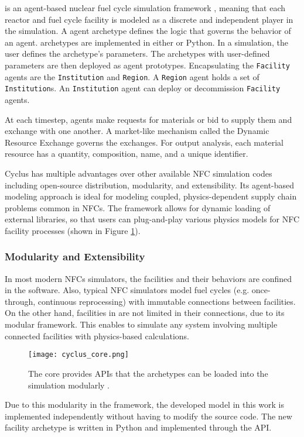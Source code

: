\Cyclus is an agent-based nuclear fuel cycle simulation framework 
\cite{huff_fundamental_2016}, meaning
that each reactor and fuel cycle facility is modeled as a discrete and independent
player in the simulation.
A \Cyclus agent archetype defines the logic that governs the behavior
of an agent. 
\Cyclus archetypes are implemented in  either \CC  or Python.
In a simulation, the user defines the archetype's
parameters. The archetypes with user-defined parameters are then deployed
as agent prototypes.  Encapsulating the \texttt{Facility} agents are the \texttt{Institution} and \texttt{Region}.
A \texttt{Region} agent holds a set of \texttt{Institution}s. 
An \texttt{Institution} agent can deploy or decommission \texttt{Facility} agents.

At each timestep,
agents make requests for materials or bid to supply them and exchange
with one another. A market-like mechanism called the Dynamic Resource Exchange
\cite{gidden_methodology_2016} governs the exchanges.
For output analysis, each material resource has a quantity, composition, name, and a unique identifier.

Cyclus has multiple advantages over other available
\gls{NFC} simulation codes including open-source distribution, modularity,
and extensibility. Its agent-based modeling approach
is ideal for modeling coupled, physics-dependent
supply chain problems common in \glspl{NFC}.
The framework allows for dynamic loading of 
external libraries, so that users can plug-and-play
various physics models for \gls{NFC} facility processes (shown in Figure \ref{fig:core}).


\subsubsection{Modularity and Extensibility}

In most modern \glspl{NFC} simulators, the facilities and their
behaviors are confined in the software.
Also, typical \gls{NFC} simulators model
fuel cycles (e.g. once-through, continuous reprocessing)
with immutable connections between facilities. On the other hand,
facilities in \Cyclus are not limited in their connections,
due to its modular framework.
This enables \Cyclus to simulate any system
involving multiple connected facilities with physics-based
calculations.

\begin{figure}[htbp!]
    \begin{center}
        \texttt{[image: cyclus\_core.png]}
    \end{center}
    \caption{The \Cyclus core provides APIs that the archetypes
            can be loaded into the simulation modularly
            \cite{huff_fundamental_2016}.}
    \label{fig:core}
\end{figure}

Due to this modularity in the \Cyclus framework, the developed
model in this work is implemented independently without
having to modify the \Cyclus source code. The new facility archetype
is written in Python and implemented through the \Cyclus API.
